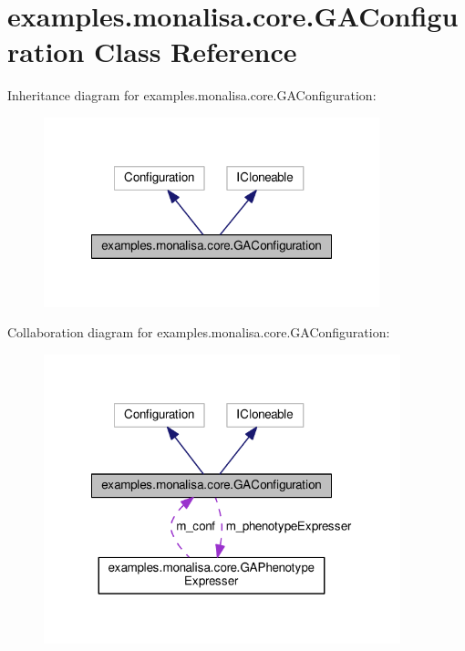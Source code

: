 \hypertarget{classexamples_1_1monalisa_1_1core_1_1_g_a_configuration}{\section{examples.\-monalisa.\-core.\-G\-A\-Configuration Class Reference}
\label{classexamples_1_1monalisa_1_1core_1_1_g_a_configuration}
}


Inheritance diagram for examples.\-monalisa.\-core.\-G\-A\-Configuration\-:
\nopagebreak
\begin{figure}[H]
\begin{center}
\leavevmode
\includegraphics[width=276pt]{classexamples_1_1monalisa_1_1core_1_1_g_a_configuration__inherit__graph}
\end{center}
\end{figure}


Collaboration diagram for examples.\-monalisa.\-core.\-G\-A\-Configuration\-:
\nopagebreak
\begin{figure}[H]
\begin{center}
\leavevmode
\includegraphics[width=293pt]{classexamples_1_1monalisa_1_1core_1_1_g_a_configuration__coll__graph}
\end{center}
\end{figure}
